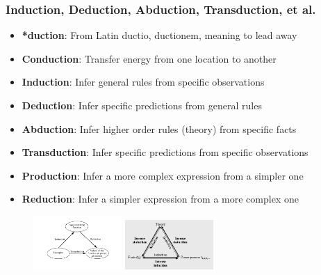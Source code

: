 \documentclass{beamer}
\begin{document}
\begin{frame}
  \frametitle{Induction, Deduction, Abduction, Transduction, et al.}
  \begin{itemize}
    \item \textbf{*duction}: From Latin ductio, ductionem, meaning to lead away
    \item \textbf{Conduction}: Transfer energy from one location to another
    \item \textbf{Induction}: Infer general rules from specific observations
    \item \textbf{Deduction}: Infer specific predictions from general rules
    \item \textbf{Abduction}: Infer higher order rules (theory) from specific facts
    \item \textbf{Transduction}: Infer specific predictions from specific observations
    \item \textbf{Production}: Infer a more complex expression from a simpler one
    \item \textbf{Reduction}: Infer a simpler expression from a more complex one
  \end{itemize}
  \begin{figure}[H]
    \centering
    \includegraphics[width=0.3\textwidth]{../clipart/induction_deduction_transduction.png}
    \includegraphics[width=0.3\textwidth]{../clipart/induction_deduction_abduction.png}
  \end{figure}
\end{frame}
\end{document}
